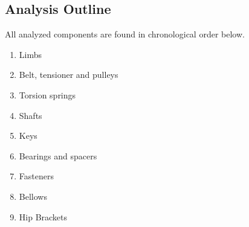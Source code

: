 \subsection{Analysis Outline} 
\label{subsec:analysis_outline}

All analyzed components are found in chronological order below.

\begin{enumerate}
    \item Limbs
    \item Belt, tensioner and pulleys
    \item Torsion springs
    \item Shafts
    \item Keys
    \item Bearings and spacers
    \item Fasteners
    \item Bellows
    \item Hip Brackets
\end{enumerate}{}